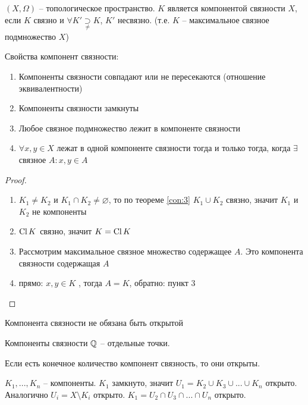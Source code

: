\documentclass[main]{subfiles}
\begin{document}
\begin{definition}
    $(X, \Omega)$ -- топологическое пространство. $K$ является компонентой связности $X$,
    если $K$ связно и $\forall K' \underset{\neq}{\supset} K$, $K'$ несвязно.
    (т.е. $K$ -- максимальное связное подмножество $X$)
\end{definition}
\begin{theorem}
    Свойства компонент связности:
    \begin{enumerate}
        \item Компоненты связности совпадают или не пересекаются (отношение эквивалентности)
        \item Компоненты связности замкнуты
        \item Любое связное подмножество лежит в компоненте связности
        \item $\forall x, y \in X$ лежат в одной компоненте связности тогда и только тогда, когда $\exists $ связное $A: x,y \in A$
    \end{enumerate}
\end{theorem}
\begin{proof}
    \begin{enumerate}
        \item  $K_1 \neq K_2$ и $K_1 \cap K_2 \neq \varnothing$, то по теореме \ref{con:3} $K_1 \cup K_2$ связно, значит $K_1$ и $K_2$ не компоненты
        \item  $\operatorname{Cl} K$ связно, значит $K = \operatorname{Cl} K$
        \item  Рассмотрим максимальное связное множество содержащее $A$. Это компонента связности содержащая $A$
        \item  прямо: $x,y \in K$ , тогда $A=K$, обратно: пункт 3
    \end{enumerate}
\end{proof}
\begin{remark}
    Компонента связности не обязана быть открытой
\end{remark}
\begin{example}
    Компоненты связности $\mathbb{Q}$ -- отдельные точки.
\end{example}
\begin{remark}
    Если есть конечное количество компонент связность, то они открыты.

    $K_1, ..., K_n$ -- компоненты.  $K_1$ замкнуто, значит $U_1 = K_2 \cup K_3 \cup ... \cup K_n$ открыто.
    Аналогично $U_i = X \setminus K_i$ открыто. $K_1 = U_2 \cap U_3 \cap ... \cap U_n$ открыто.
\end{remark}
\end{document}
